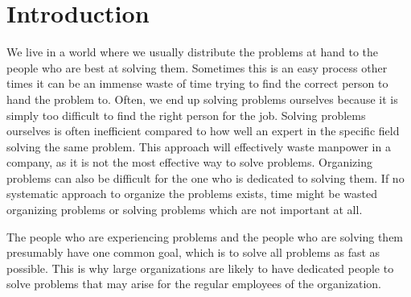 \chapter{Introduction}
\label{sec:introduction}
\emptyTop{}%
\vspace{-15mm}%


We live in a world where we usually distribute the problems at hand to the people who are best at solving them.
Sometimes this is an easy process other times it can be an immense waste of time trying to find the correct person to hand the problem to.
Often, we end up solving problems ourselves because it is simply too difficult to find the right person for the job.
Solving problems ourselves is often inefficient compared to how well an expert in the specific field solving the same problem.
This approach will effectively waste manpower in a company, as it is not the most effective way to solve problems.
Organizing problems can also be difficult for the one who is dedicated to solving them.
If no systematic approach to organize the problems exists, time might be wasted organizing problems or solving problems which are not important at all.

The people who are experiencing problems and the people who are solving them presumably have one common goal, which is to solve all problems as fast as possible.
This is why large organizations are likely to have dedicated people to solve problems that may arise for the regular employees of the organization.

